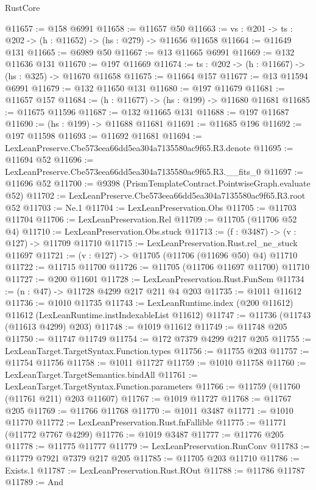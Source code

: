 \begin{lexlean}{RustCore}
\begin{coremodule}
@11657 := @158 @6991
@11658 := @11657 @50
@11663 := {vs : @201} -> {ts : @202} -> (h : @11652) -> (hs : @279) -> @11656 @11658
@11664 := @11649 @131
@11665 := @6989 @50
@11667 := @13 @11665 @6991
@11669 := @132 @11636 @131
@11670 := @197 @11669
@11674 := {ts : @202} -> (h : @11667) -> (hs : @325) -> @11670 @11658
@11675 := @11664 @157
@11677 := @13 @11594 @6991
@11679 := @132 @11650 @131
@11680 := @197 @11679
@11681 := @11657 @157
@11684 := (h : @11677) -> (hs : @199) -> @11680 @11681
@11685 := @11675 @11596
@11687 := @132 @11665 @131
@11688 := @197 @11687
@11690 := (hs : @199) -> @11688 @11681
@11691 := @11685 @196
@11692 := @197 @11598
@11693 := @11692 @11681
@11694 := LexLeanPreserve.Cbe573eea66dd5ea304a7135580ac9f65.R3.denote
@11695 := @11694 @52
@11696 := LexLeanPreserve.Cbe573eea66dd5ea304a7135580ac9f65.R3.__fits_0
@11697 := @11696 @52
@11700 := @9398 (PrismTemplateContract.PointwiseGraph.evaluate @52)
@11702 := LexLeanPreserve.Cbe573eea66dd5ea304a7135580ac9f65.R3.root @52
@11703 := Ne.{1}
@11704 := LexLeanPreservation.Obs
@11705 := @11703 @11704
@11706 := LexLeanPreservation.Rel
@11709 := @11705 (@11706 @52 @4)
@11710 := LexLeanPreservation.Obs.stuck
@11713 := (f : @3487) -> (v : @127) -> @11709 @11710
@11715 := LexLeanPreservation.Rust.rel_ne_stuck @11697
@11721 := (v : @127) -> @11705 (@11706 (@11696 @50) @4) @11710
@11722 := @11715 @11700
@11726 := @11705 (@11706 @11697 @11700) @11710
@11727 := @200 @11601
@11728 := LexLeanPreservation.Rust.FunSem
@11734 := (n : @47) -> @11728 @4299 @217 @211 @4 @203
@11735 := @1011 @11612
@11736 := @1010 @11735
@11743 := LexLeanRuntime.index (@200 @11612) @11612 (LexLeanRuntime.instIndexableList @11612)
@11747 := @11736 (@11743 (@11613 @4299) @203)
@11748 := @1019 @11612
@11749 := @11748 @205
@11750 := @11747 @11749
@11754 := @172 @7379 @4299 @217 @205
@11755 := LexLeanTarget.TargetSyntax.Function.types
@11756 := @11755 @203
@11757 := @11754 @11756
@11758 := @1011 @11727
@11759 := @1010 @11758
@11760 := LexLeanTarget.TargetSemantics.bindAll
@11761 := LexLeanTarget.TargetSyntax.Function.parameters
@11766 := @11759 (@11760 (@11761 @211) @203 @11607)
@11767 := @1019 @11727
@11768 := @11767 @205
@11769 := @11766 @11768
@11770 := @1011 @3487
@11771 := @1010 @11770
@11772 := LexLeanPreservation.Rust.fnFallible
@11775 := @11771 (@11772 @7767 @4299)
@11776 := @1019 @3487
@11777 := @11776 @205
@11778 := @11775 @11777
@11779 := LexLeanPreservation.RunConv
@11783 := @11779 @7921 @7379 @217 @205
@11785 := @11705 @203 @11710
@11786 := Exists.{1}
@11787 := LexLeanPreservation.Rust.ROut
@11788 := @11786 @11787
@11789 := And

\end{coremodule}
\end{lexlean}
